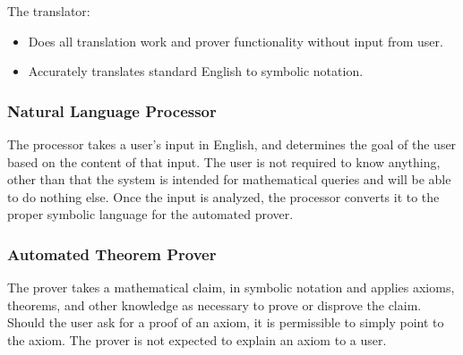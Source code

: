   The translator:                                                                     
  \begin{itemize}                                                                                          
	  \item{Does all translation work and prover functionality without input from user.}
  \item{Accurately translates standard English to symbolic notation.}                                      
  \end{itemize}


  \subsubsection{Natural Language Processor}                                                               
The processor takes a user's input in English, and determines the goal of the user based on the content of that input. The user is not required to know anything, other than that the system is intended for mathematical queries and will be able to do nothing else. Once the input is analyzed, the processor converts it to the proper symbolic language for the automated prover.                                         
  \subsubsection{Automated Theorem Prover}                                                                 
                                                                                                           
The prover takes a mathematical claim, in symbolic notation and applies axioms, theorems, and other knowledge as necessary to prove or disprove the claim. Should the user ask for a proof of an axiom, it is permissible to simply point to the axiom. The prover is not expected to explain an axiom to a user.   
